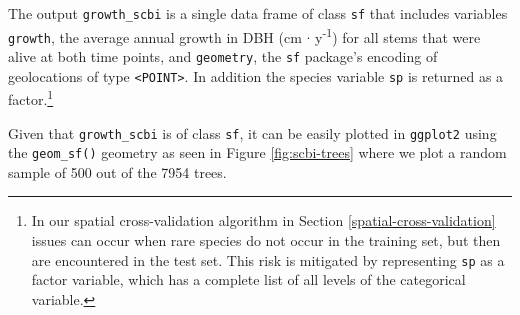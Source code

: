 \documentclass[12pt]{article}
\newenvironment{Shaded}{\begin{snugshade}}{\end{snugshade}}
\newcommand{\CommentTok}[1]{\textcolor[rgb]{0.56,0.35,0.01}{\textit{#1}}}
\newcommand{\DataTypeTok}[1]{\textcolor[rgb]{0.13,0.29,0.53}{#1}}
\newcommand{\DecValTok}[1]{\textcolor[rgb]{0.00,0.00,0.81}{#1}}
\newcommand{\KeywordTok}[1]{\textcolor[rgb]{0.13,0.29,0.53}{\textbf{#1}}}
\newcommand{\NormalTok}[1]{#1}
\newcommand{\OperatorTok}[1]{\textcolor[rgb]{0.81,0.36,0.00}{\textbf{#1}}}
\newcommand{\StringTok}[1]{\textcolor[rgb]{0.31,0.60,0.02}{#1}}
\begin{document}
\begin{Shaded}
\end{Shaded}

The output \texttt{growth\_scbi} is a single data frame of class
\texttt{sf} that includes variables \texttt{growth}, the average annual
growth in DBH (cm \(\cdot\) y\textsuperscript{-1}) for all stems that
were alive at both time points, and \texttt{geometry}, the \texttt{sf}
package's encoding of geolocations of type
\texttt{\textless{}POINT\textgreater{}}. In addition the species
variable \texttt{sp} is returned as a factor.\footnote{In our spatial
  cross-validation algorithm in Section \ref{spatial-cross-validation}
  issues can occur when rare species do not occur in the training set,
  but then are encountered in the test set. This risk is mitigated by
  representing \texttt{sp} as a factor variable, which has a complete
  list of all levels of the categorical variable.}

Given that \texttt{growth\_scbi} is of class \texttt{sf}, it can be
easily plotted in \texttt{ggplot2} using the \texttt{geom\_sf()}
geometry as seen in Figure \ref{fig:scbi-trees} where we plot a random
sample of 500 out of the 7954 trees.
\end{document}
